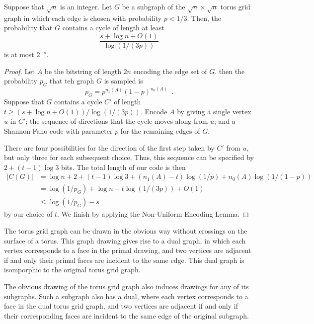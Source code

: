\documentclass[prodmode,acmcsur]{acmsmall}
\begin{document}
\begin{thm}
  Suppose that $\sqrt{n}$ is an integer.  Let $G$ be a subgraph of the
  $\sqrt{n} \times \sqrt{n}$ torus grid graph in which each edge is
  chosen with probability $p < 1/3$. Then, the probability that $G$
  contains a cycle of length at least
  \[
    \frac{s + \log n + O(1)}{\log (1/(3p))}
  \]
  is at most $2^{-s}$.
\end{thm}
\begin{proof}
  Let $A$ be the bitstring of length $2n$ encoding the edge set of
  $G$. then the probability $p_G$ that teh graph $G$ is sampled is
  \[
     p_G  = p^{n_1(A)}(1-p)^{n_0(A)} \enspace .
  \]
  Suppose that $G$ contains a cycle $C'$ of length
  $t \geq (s + \log n + O(1))/\log (1/(3p))$. Encode $A$ by giving a
  single vertex $u$ in $C'$; the sequence of directions that the cycle
  moves along from $u$; and a Shannon-Fano code with parameter $p$ for
  the remaining edges of $G$.

  There are four possibilities for the direction of the
  first step taken by $C'$ from $u$, but only three for each
  subsequent choice. Thus, this sequence can be specified by
  $2 + (t - 1) \log 3$ bits. The total length of our code is then
  \begin{align*}
    |C(G)| &= \log n + 2 + (t - 1) \log 3 + (n_1(A) - t) \log (1/p) +
             n_0(A) \log (1/(1 - p)) \\
           &= \log (1/p_G) + \log n - t \log (1/(3p)) + O(1) \\
           &\leq \log (1/p_G) - s
  \end{align*}
  by our choice of $t$. We finish by applying the Non-Uniform Encoding
  Lemma.
\end{proof}

The torus grid graph can be drawn in the obvious way without crossings
on the surface of a torus. This graph drawing gives rise to a dual
graph, in which each vertex corresponds to a face in the primal
drawing, and two vertices are adjacent if and only their primal faces
are incident to the same edge. This dual graph is isomporphic to the
original torus grid graph.

The obvious drawing of the torus grid graph also induces drawings for
any of its subgraphs. Such a subgraph also has a dual, where each
vertex corresponds to a face in the dual torus grid graph, and two
vertices are adjacent if and only if their corresponding faces are
incident to the same edge of the original subgraph.
\end{document}
